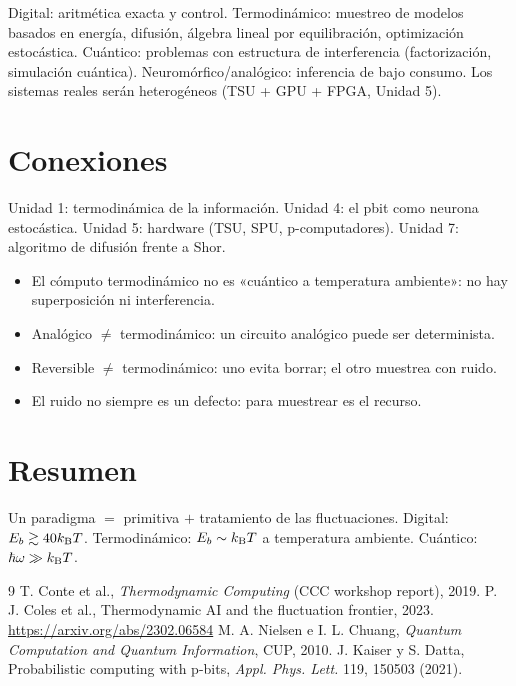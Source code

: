 \documentclass[11pt,a4paper]{article}
\begin{document}
\begin{aplicacion}
Digital: aritmética exacta y control. Termodinámico: muestreo de modelos basados en energía, difusión,
álgebra lineal por equilibración, optimización estocástica. Cuántico: problemas con estructura de
interferencia (factorización, simulación cuántica). Neuromórfico/analógico: inferencia de bajo consumo.
Los sistemas reales serán heterogéneos (TSU + GPU + FPGA, Unidad 5).
\end{aplicacion}

\section{Conexiones}
Unidad 1: termodinámica de la información. Unidad 4: el pbit como neurona estocástica. Unidad 5: hardware
(TSU, SPU, p-computadores). Unidad 7: algoritmo de difusión frente a Shor.

\begin{error}
\begin{itemize}[nosep]
\item El cómputo termodinámico no es «cuántico a temperatura ambiente»: no hay superposición ni interferencia.
\item Analógico $\neq$ termodinámico: un circuito analógico puede ser determinista.
\item Reversible $\neq$ termodinámico: uno evita borrar; el otro muestrea con ruido.
\item El ruido no siempre es un defecto: para muestrear es el recurso.
\end{itemize}
\end{error}

\section{Resumen}
Un paradigma $=$ primitiva $+$ tratamiento de las fluctuaciones. Digital: $E_b\gtrsim40k_{\mathrm B} T$.
Termodinámico: $E_b\sim k_{\mathrm B} T$ a temperatura ambiente. Cuántico: $\hbar\omega\gg k_{\mathrm B} T$.

\begin{thebibliography}{9}\small
{} T. Conte et al., \emph{Thermodynamic Computing} (CCC workshop report), 2019.
 P. J. Coles et al., Thermodynamic AI and the fluctuation frontier, 2023. \url{https://arxiv.org/abs/2302.06584}
 M. A. Nielsen e I. L. Chuang, \emph{Quantum Computation and Quantum Information}, CUP, 2010.
 J. Kaiser y S. Datta, Probabilistic computing with p-bits, \emph{Appl. Phys. Lett.} 119, 150503 (2021).
\end{thebibliography}
\end{document}
